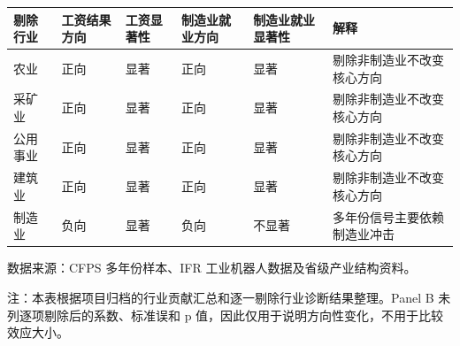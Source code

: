 {\def\LTcaptype{none} %
\begin{longtable}[]{@{}
  >{\centering\arraybackslash}p{}
  >{\centering\arraybackslash}p{}
  >{\centering\arraybackslash}p{}
  >{\centering\arraybackslash}p{}
  >{\centering\arraybackslash}p{}
  >{\centering\arraybackslash}p{}@{}}
\toprule\noalign{}
\begin{minipage}[b]{\linewidth}\centering
\textbf{剔除行业}
\end{minipage} & \begin{minipage}[b]{\linewidth}\centering
\textbf{工资结果方向}
\end{minipage} & \begin{minipage}[b]{\linewidth}\centering
\textbf{工资显著性}
\end{minipage} & \begin{minipage}[b]{\linewidth}\centering
\textbf{制造业就业方向}
\end{minipage} & \begin{minipage}[b]{\linewidth}\centering
\textbf{制造业就业显著性}
\end{minipage} & \begin{minipage}[b]{\linewidth}\centering
\textbf{解释}
\end{minipage} \\
\midrule\noalign{}
\endhead
\bottomrule\noalign{}
\endlastfoot
农业 & 正向 & 显著 & 正向 & 显著 & 剔除非制造业不改变核心方向 \\
采矿业 & 正向 & 显著 & 正向 & 显著 & 剔除非制造业不改变核心方向 \\
公用事业 & 正向 & 显著 & 正向 & 显著 & 剔除非制造业不改变核心方向 \\
建筑业 & 正向 & 显著 & 正向 & 显著 & 剔除非制造业不改变核心方向 \\
制造业 & 负向 & 显著 & 负向 & 不显著 & 多年份信号主要依赖制造业冲击 \\
\end{longtable}
}

数据来源：CFPS 多年份样本、IFR 工业机器人数据及省级产业结构资料。

注：本表根据项目归档的行业贡献汇总和逐一剔除行业诊断结果整理。Panel B 未列逐项剔除后的系数、标准误和 p 值，因此仅用于说明方向性变化，不用于比较效应大小。

